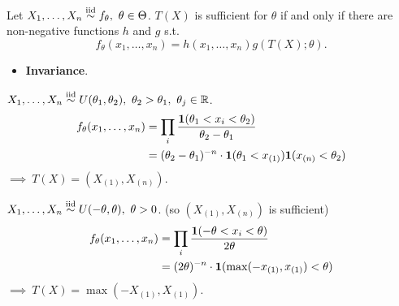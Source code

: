 {\color{blue}
\begin{thm} 
	Let $X_1,\dots,X_n \SimIID f_\theta, \ \theta\in \Theta$. $T(X)$ is sufficient for $\theta$ if and only if there are non-negative functions $h$ and $g$ s.t.
	$$f_\theta(x_1, \dots, x_n) = h(x_1, \dots, x_n) g(T(X); \theta).$$
\end{thm}
}
\begin{remark}\textbf{ }
	\begin{itemize}
		\item \textbf{Invariance}. 
		
	\end{itemize}
\end{remark}

\begin{exap} $X_1,\dots,X_n \stackrel{\text{iid}}{\sim} U(\theta_1, \theta_2), \ \theta_2> \theta_1,\ \theta_j \in \mathbb{R}$.
	\begin{align*}
		f_{\theta}(x_1, \dots, x_n) & = \prod_{i} \frac{ \boldsymbol{1}(\theta_1 < x_i < \theta_2)}{\theta_2 - \theta_1} \\
		& = (\theta_2 - \theta_1)^{-n} \cdot \boldsymbol{1}(\theta_1 < x_{(1)}) \boldsymbol{1}( x_{(n)} < \theta_2)
	\end{align*}
	$\implies \ T(X) = (X_{(1)}, X_{(n)} )$.
\end{exap}

\begin{exap} $X_1,\dots,X_n \stackrel{\text{iid}}{\sim} U(-\theta, \theta), \ \theta>0$. (so $(X_{(1)}, X_{(n)} )$ is sufficient)
	\begin{align*}
	f_{\theta}(x_1, \dots, x_n) & = \prod_{i} \frac{ \boldsymbol{1}(-\theta < x_i < \theta)}{2 \theta} \\
	& = (2 \theta )^{-n} \cdot \boldsymbol{1}( \max(-x_{(1)} , x_{(1)}) < \theta)
	\end{align*}
	$\implies \ T(X) = \max(-X_{(1)} , X_{(1)})$.
\end{exap}

